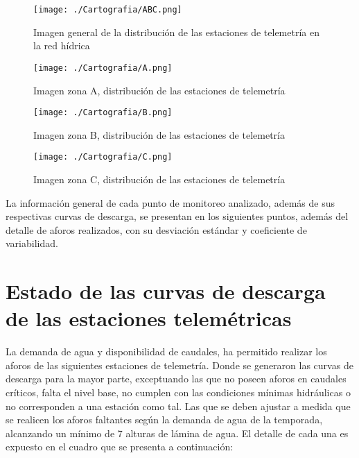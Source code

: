 \documentclass[]{article}
\begin{document}
\clearpage

\begin{sidewaysfigure}[htb]
   \centering
   \texttt{[image: ./Cartografia/ABC.png]}
   \caption{Imagen general de la distribución de las estaciones de telemetría en la red hídrica}
\end{sidewaysfigure}

\clearpage

\begin{sidewaysfigure}[htb]
   \centering
   \texttt{[image: ./Cartografia/A.png]}
   \caption{Imagen zona A, distribución de las estaciones de telemetría}
\end{sidewaysfigure}

\clearpage

\begin{sidewaysfigure}[htb]
   \centering
   \texttt{[image: ./Cartografia/B.png]}
   \caption{Imagen zona B, distribución de las estaciones de telemetría}
\end{sidewaysfigure}

\clearpage

\begin{sidewaysfigure}[htb]
   \centering
   \texttt{[image: ./Cartografia/C.png]}
   \caption{Imagen zona C, distribución de las estaciones de telemetría}
\end{sidewaysfigure}

\clearpage

La información general de cada punto de monitoreo analizado, además de
sus respectivas curvas de descarga, se presentan en los siguientes
puntos, además del detalle de aforos realizados, con su desviación estándar y coeficiente de variabilidad.


\section{Estado de las curvas de descarga de las estaciones telemétricas}

La demanda de agua y disponibilidad de caudales, ha permitido realizar los aforos de las siguientes estaciones de telemetría. Donde se generaron las curvas de descarga para la mayor parte, exceptuando las que no poseen aforos en caudales críticos, falta el nivel base, no cumplen con las condiciones mínimas hidráulicas o no corresponden a una estación como tal. Las que se deben ajustar a medida que se realicen los aforos faltantes según la demanda de agua de la temporada, alcanzando un mínimo de 7 alturas de lámina de agua. El detalle de cada una es expuesto en el cuadro que se presenta a continuación:
\end{document}
